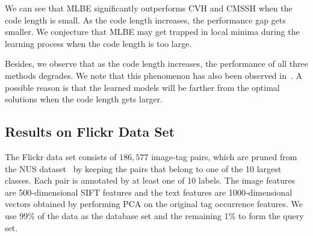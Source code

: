 We can see that \mbox{MLBE} significantly outperforms \mbox{CVH} and \mbox{CMSSH} when the code length is small.  As the code length increases, the performance gap gets smaller. We conjecture that \mbox{MLBE} may get trapped in local minima during the learning process when the code length is too large. %

Besides, we observe that as the code length increases, the performance of all three methods degrades.  We note that this phenomenon has also been observed in~\cite{wang2010cvpr,liu2011icml}.  A possible reason is that the learned models will be farther from the optimal solutions when the code length gets larger. %

\subsection{Results on \mbox{Flickr} Data Set}
\label{sec:exps:flickr}




The \mbox{Flickr} data set consists of $186{,}577$ image-tag pairs, which are pruned from the \mbox{NUS} dataset~\cite{nus-wide-civr09} by keeping the pairs that belong to one of the 10 largest classes. Each pair is annotated by at least one of 10 labels. The image features are 500-dimensional \mbox{SIFT} features and the text features are 1000-dimensional vectors obtained by performing \mbox{PCA} on the original tag occurrence features. We use 99\% of the data as the database set and the remaining 1\% to form the query set.

